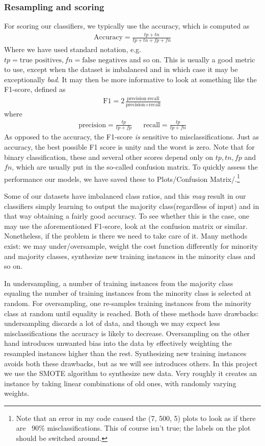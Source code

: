 \documentclass[]{article}
\begin{document}
\subsubsection{Resampling and scoring}
For scoring our classifiers, we typically use the accuracy, which is computed as
\begin{align}
\text{Accuracy} = \frac{tp+tn}{tp+tn+fp+fn}
\end{align}
Where we have used standard notation, e.g. $tp = \text{true positives}, fn = \text{false negatives}$ and so on. This is usually a good metric to use, except when the dataset is imbalanced and in which case it may be exceptionally \textit{bad}. It may then be more informative to look at something like the F1-score, defined as
\begin{align}
\text{F}1 = 2\frac{\text{precision}\cdot\text{recall}}{\text{precision}+\text{recall}}
\end{align}
where
\begin{align}
\text{precision} = \frac{tp}{tp+fp} && \text{recall} = \frac{tp}{tp+fn}
\end{align}
As opposed to the accuracy, the F1-score \textit{is} sensitive to misclassifications. Just as accuracy, the best possible F1 score is unity and the worst is zero. Note that for binary classification, these and several other scores depend only on $tp, tn, fp$ and $fn$, which are usually put in the so-called confusion matrix. To quickly assess the performance our models, we have saved these to Plots/Confusion Matrix/.\footnote{Note that an error in my code caused the (7, 500, 5) plots to look as if there are ~90\% misclassifications. This of course isn't true; the labels on the plot should be switched around.}

Some of our datasets have imbalanced class ratios, and this \textit{may} result in our classifiers simply learning to output the majority class(regardless of input) and in that way obtaining a fairly good accuracy. To see whether this is the case, one may use the aforementioned F1-score, look at the confusion matrix or similar. Nonetheless, if the problem is there we need to take care of it. Many methods exist: we may under/oversample, weight the cost function differently for minority and majority classes, synthesize new training instances in the minority class and so on. 

In undersampling, a number of training instances from the majority class equaling the number of training instances from the minority class is selected at random. For oversampling, one re-samples training instances from the minority class at random until equality is reached. Both of these methods have drawbacks: undersampling discards a lot of data, and though we may expect less misclassifications the accuracy is likely to decrease. Oversampling on the other hand introduces unwanted bias into the data by effectively weighting the resampled instances higher than the rest. Synthesizing new training instances avoids both these drawbacks, but as we will see introduces others. In this project we use the SMOTE algorithm to synthesize new data. Very roughly it creates an instance by taking linear combinations of old ones, with randomly varying weights.
\end{document}
